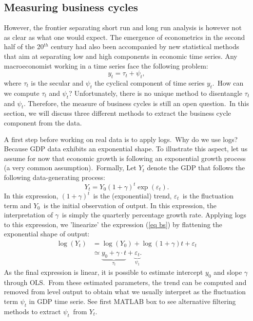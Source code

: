 \documentclass[a4paper,12pt]{article}%
\begin{document}
\subsection{Measuring business cycles}

However, the frontier separating short run and long run analysis is however
not as clear as what one would expect. The emergence of econometrics in the
second half of the 20$^{th}$ century had also been accompanied by new
statistical methods that aim at separating low and high components in economic
time series. Any macroeconomist working in a time series face the following
problem:%
\begin{equation}
y_{t}=\tau_{t}+\psi_{t},
\end{equation}
where $\tau_{t}$ is the secular and $\psi_{t}$ the cyclical component of time
series $y_{t}$.\ How can we compute $\tau_{t}$ and $\psi_{t}$? Unfortunately,
there is no unique method to disentangle $\tau_{t}$ and $\psi_{t}$. Therefore,
the measure of business cycles is still an open question.\ In this section, we
will discuss three different methods to extract the business cycle component
from the data.

A first step before working on real data is to apply logs.\ Why do
we use logs? Because GDP data exhibits an exponential shape. To illustrate
this aspect, let us assume for now that economic growth is following an
exponential growth process (a very common assumption).\ Formally, Let $Y_{t}$
denote the GDP that follows the following data-generating process:
\begin{equation}
Y_{t}=Y_{0}\left(  1+\gamma\right)  ^{t}\exp(\varepsilon_{t}). \label{eq bs}%
\end{equation}
In this expression, $\left(  1+\gamma\right)  ^{t}$\ is the (exponential)
trend, $\varepsilon_{t}$\ is the fluctuation term and $Y_{0}$\ is the initial
observation of output. In this expression, the interpretation of $\gamma$\ is
simply the quarterly percentage growth rate. Applying logs to this expression,
we 'linearize' the expression (\ref{eq bs}) by flattening the exponential
shape of output:%
\begin{align}
\log(Y_{t})  &  =\log(Y_{0})+\log(1+\gamma)t+\varepsilon_{t}\\
&  \simeq\underset{\tau_{t}}{\underbrace{y_{0}+\gamma\cdot t}}+\underset
{\psi_{t}}{\underbrace{\varepsilon_{t}}}.
\end{align}
As the final expression is linear, it is possible to estimate intercept
$y_{0}$ and slope $\gamma$ through OLS.\ From these estimated parameters, the
trend can be computed and removed from level output to obtain what we usually
interpret as the fluctuation term $\psi_{t}$ in GDP time serie. See first
MATLAB box to see alternative filtering methods to extract $\psi_{t}$\ from
$Y_{t}$.%
\end{document}
